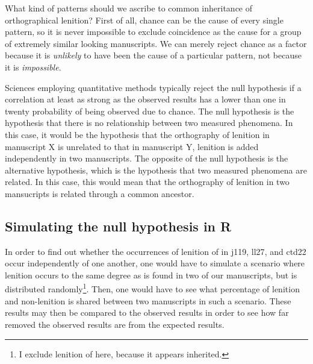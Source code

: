 What kind of patterns should we ascribe to common inheritance of orthographical lenition? First of all, chance can be the cause of every single pattern, so it is never impossible to exclude coincidence as the cause for a group of extremely similar looking manuscripts. We can merely reject chance as a factor because it is \emph{unlikely} to have been the cause of a particular pattern, not because it is \emph{impossible}.

Sciences employing quantitative methods typically reject the null hypothesis if a correlation at least as strong as the observed results has a lower than one in twenty probability of being observed due to chance.  The null hypothesis is the hypothesis that there is no relationship between two measured phenomena. In this case, it would be the hypothesis that the orthography of lenition in manuscript X is unrelated to that in manuscript Y, \ie lenition is added independently in two manuscripts. The opposite of the null hypothesis is the alternative hypothesis, which is the hypothesis that two measured phenomena are related. In this case, this would mean that the orthography of lenition in two mansucripts is related through a common ancestor.

\subsection{Simulating the null hypothesis in R}
\label{sec:simul-null-hypoth}

In order to find out whether the occurrences of lenition of  in \gls{j119}, \gls{ll27}, and \gls{ctd22} occur independently of one another, one would have to simulate a scenario where lenition occurs to the same degree as is found in two of our manuscripts, but is distributed randomly\footnote{I exclude lenition of  here, because it appears inherited.}. Then, one would have to see what percentage of lenition and non-lenition is shared between two manuscripts in such a scenario. These results may then be compared to the observed results in order to see how far removed the observed results are from the expected results.

